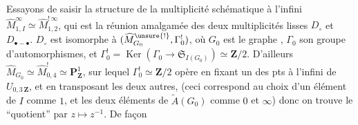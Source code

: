 Essayons de  saisir la structure de la multiplicité schématique à l'infini $\widehat M^\infty_{1,I}\simeq\widehat M^{!\,\infty}_{1,2}$, qui est la réunion amalgamée des deux multiplicités lisses  $D_\circ$ et $D_{\bullet-\bullet}$.
$D_\circ$ est isomorphe à $(\widehat M^{\unsure{!}}_{G_0},\Gamma^!_0)$, où $G_0$ est le graphe
,
$\Gamma_0$ son groupe d'automorphismes, et $\Gamma^!_0=\operatorname{Ker}(\Gamma_0\longrightarrow\mathfrak S_{I(G_0)})\simeq\mathbf Z/2$.
D'ailleurs $\widehat M_{G_0}\simeq\widehat M^!_{0,4}\simeq\mathbf P^1_{\mathbf Z}$, sur lequel $\Gamma^!_0\simeq\mathbf Z/2$ opère en fixant un des  pts à l'infini de $U_{0,3\,\mathbf Z}$,  et en transposant les deux autres,   (ceci correspond au choix d'un élément de $I$ comme $1$, et les deux éléments de $\widetilde A(G_0)$ comme $0$ et $\infty$) donc on trouve le ``quotient'' par $z\longmapsto z^{-1}$. De façon
